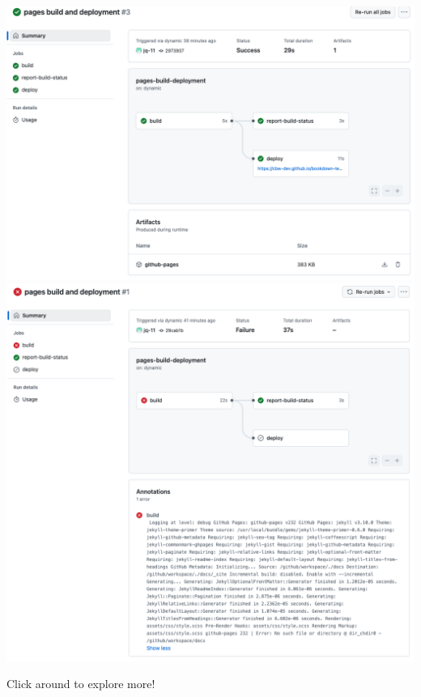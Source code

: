 \documentclass[
]{book}
\theoremstyle{definition}
\theoremstyle{definition}
\theoremstyle{definition}
\theoremstyle{definition}
\theoremstyle{remark}
\begin{document}
\includegraphics{img/git-instruct/successful-deploy.png}
\includegraphics{img/git-instruct/failed-deploy.png}

Click around to explore more!

  
\end{document}
